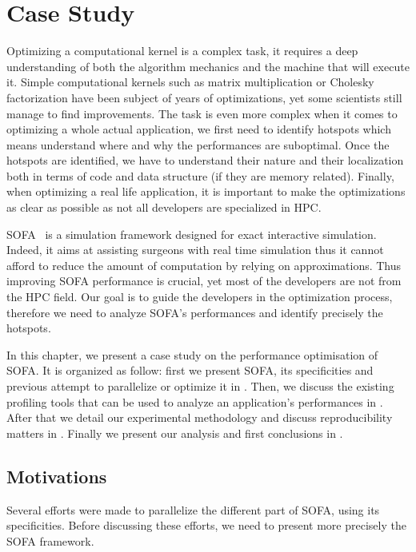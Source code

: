 \chapter{Case Study}
\label{chap:perf}

Optimizing a computational kernel is a complex task, it requires a deep understanding of both the algorithm mechanics and the machine that will execute it.
Simple computational kernels such as matrix multiplication or Cholesky factorization have been subject of years of optimizations, yet some scientists still manage to find improvements.
The task is even more complex when it comes to optimizing a whole actual application, we first need to identify hotspots which means understand where and why the performances are suboptimal.
Once the hotspots are identified, we have to understand their nature and their localization both in terms of code and data structure (if they are memory related).
Finally, when optimizing a real life application, it is important to make the optimizations as clear as possible as not all developers are specialized in \gls{HPC}.

\gls{SOFA}~\cite{Allard07SOFA} is a simulation framework designed for exact interactive simulation.
Indeed, it aims at assisting surgeons with real time simulation thus  it cannot afford to reduce the amount of computation by relying on approximations.
Thus improving \gls{SOFA} performance is crucial, yet most of the developers are not from the \gls{HPC} field.
Our goal is to guide the developers in the optimization process, therefore we need to analyze \gls{SOFA}'s performances and identify precisely the hotspots.

In this chapter, we present a case study on the performance optimisation of \gls{SOFA}.
It is organized as follow: first we present \gls{SOFA}, its specificities and previous attempt to parallelize or optimize it in .
Then, we discuss the existing profiling tools that can be used to analyze an application's performances in .
After that we detail our experimental methodology and discuss reproducibility matters in .
Finally we present our analysis and first conclusions in .

\section{Motivations}
\label{sec:motivations}

Several efforts were made to parallelize the different part of \gls{SOFA}, using its specificities.
Before discussing these efforts, we need to present more precisely the \gls{SOFA} framework.

